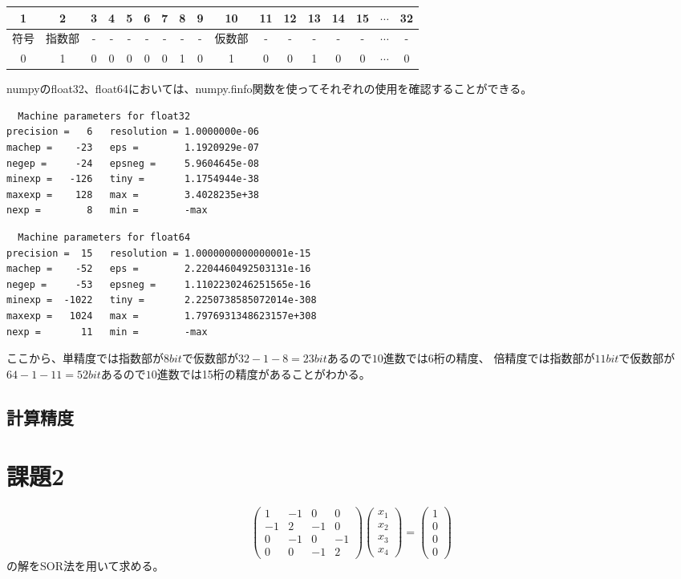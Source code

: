 \documentclass{jsarticle}
\begin{document}
\begin{tabular}{|c|c|c|c|c|c|c|c|c|c|c|c|c|c|c|c|c|}\hline
1&2&3&4&5&6&7&8&9&10&11&12&13&14&15&$\cdots$&32\\\hline
符号 & 指数部&-&-&-&-&-&-&-&仮数部&-&-&-&-&-&$\cdots$&-\\\hline
0&1&0&0&0&0&0&1&0&1&0&0&1&0&0&$\cdots$&0\\\hline
\end{tabular}



numpyのfloat32、float64においては、numpy.finfo関数を使ってそれぞれの使用を確認することができる。

\begin{lstlisting}
  Machine parameters for float32
precision =   6   resolution = 1.0000000e-06
machep =    -23   eps =        1.1920929e-07
negep =     -24   epsneg =     5.9604645e-08
minexp =   -126   tiny =       1.1754944e-38
maxexp =    128   max =        3.4028235e+38
nexp =        8   min =        -max
\end{lstlisting}
\begin{lstlisting}
  Machine parameters for float64
precision =  15   resolution = 1.0000000000000001e-15
machep =    -52   eps =        2.2204460492503131e-16
negep =     -53   epsneg =     1.1102230246251565e-16
minexp =  -1022   tiny =       2.2250738585072014e-308
maxexp =   1024   max =        1.7976931348623157e+308
nexp =       11   min =        -max
\end{lstlisting}

ここから、単精度では指数部が$8bit$で仮数部が$32-1-8=23bit$あるので$10$進数では6桁の精度、
倍精度では指数部が$11bit$で仮数部が$64-1-11=52bit$あるので$10$進数では15桁の精度があることがわかる。
\subsection{計算精度}
\section{課題2}
\begin{equation}
  \left(
  \begin{array}{rrrr}
      1 & -1 & 0& 0\\
      -1 & 2 & -1 & 0\\
      0 & -1 & 0 & -1\\
      0 & 0 & -1 & 2 
  \end{array}
  \right)
  \left(
  \begin{array}{r}
      x_1\\
      x_2\\
      x_3\\
      x_4 
  \end{array}
  \right)
  =
  \left(
  \begin{array}{r}
      1\\
      0\\
      0\\
      0
  \end{array}
  \right)
\end{equation}
の解をSOR法を用いて求める。
\end{document}
